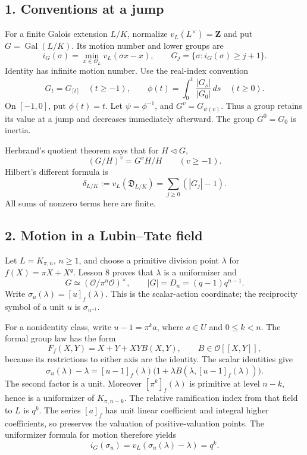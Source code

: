 \documentclass[11pt,a4paper]{article}
\begin{document}
\subsection{1. Conventions at a jump}\label{conventions-at-a-jump}

For a finite Galois extension \(L/K\), normalize
\(v_L(L^\times)=\mathbf Z\) and put \(G=\operatorname{Gal}(L/K)\). Its
motion number and lower groups are \[
i_G(\sigma)=\min_{x\in\mathcal O_L}v_L(\sigma x-x),\qquad
G_j=\{\sigma:i_G(\sigma)\geq j+1\}.
\] Identity has infinite motion number. Use the real-index convention \[
G_t=G_{\lceil t\rceil}\quad(t\geq-1),\qquad
\phi(t)=\int_0^t\frac{|G_s|}{|G_0|}\,ds\quad(t\geq0).
\tag{1}
\] On \([-1,0]\), put \(\phi(t)=t\). Let \(\psi=\phi^{-1}\), and
\(G^v=G_{\psi(v)}\). Thus a group retains its value at a jump and
decreases immediately afterward. The group \(G^0=G_0\) is inertia.

Herbrand's quotient theorem says that for \(H\triangleleft G\), \[
(G/H)^v=G^vH/H\qquad(v\geq-1).
\tag{2}
\] Hilbert's different formula is \[
\delta_{L/K}:=v_L(\mathfrak D_{L/K})
       =\sum_{j\geq0}(|G_j|-1).
\tag{3}
\] All sums of nonzero terms here are finite.

\subsection{2. Motion in a Lubin--Tate
field}\label{motion-in-a-lubintate-field}

Let \(L=K_{\pi,n}\), \(n\geq1\), and choose a primitive division point
\(\lambda\) for \(f(X)=\pi X+X^q\). Lesson 8 proves that \(\lambda\) is
a uniformizer and \[
G\simeq(\mathcal O/\pi^n\mathcal O)^\times,\qquad
|G|=D_n=(q-1)q^{n-1}.
\] Write \(\sigma_u(\lambda)=[u]_f(\lambda)\). This is the scalar-action
coordinate; the reciprocity symbol of a unit \(u\) is
\(\sigma_{u^{-1}}\).

For a nonidentity class, write \(u-1=\pi^k a\), where \(a\in U\) and
\(0\leq k<n\). The formal group law has the form \[
F_f(X,Y)=X+Y+XYB(X,Y),\qquad B\in\mathcal O[[X,Y]],
\] because its restrictions to either axis are the identity. The scalar
identities give \[
\sigma_u(\lambda)-\lambda
 =[u-1]_f(\lambda)\bigl(1+\lambda B(\lambda,[u-1]_f(\lambda))\bigr).
\tag{4}
\] The second factor is a unit. Moreover \([\pi^k]_f(\lambda)\) is
primitive at level \(n-k\), hence is a uniformizer of \(K_{\pi,n-k}\).
The relative ramification index from that field to \(L\) is \(q^k\). The
series \([a]_f\) has unit linear coefficient and integral higher
coefficients, so preserves the valuation of positive-valuation points.
The uniformizer formula for motion therefore yields \[
i_G(\sigma_u)=v_L(\sigma_u(\lambda)-\lambda)=q^k.
\tag{5}
\]
\end{document}
